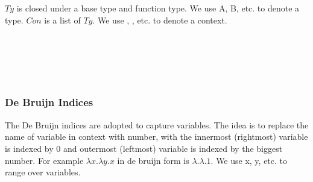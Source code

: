 $Ty$ is closed under a base type and function type. We use A, B, etc. to denote a type. $Con$ is a list of $Ty$. We use \Gamma, \Delta, etc. to denote a context.

\begin{code}[hide]%
\>[0]\AgdaSpace{}%
\AgdaSpace{}%
\<%
\\
\>[0]\AgdaSpace{}%
\AgdaSpace{}%
\AgdaSpace{}%
\AgdaSpace{}%
\AgdaSymbol{:}\AgdaSpace{}%
\<%
\\
%
\\[\AgdaEmptyExtraSkip]%
\>[0]\AgdaSpace{}%
\AgdaSpace{}%
\<%
\\
\>[0]\AgdaSpace{}%
\AgdaSpace{}%
\AgdaSpace{}%
\AgdaSpace{}%
\AgdaSymbol{:}\AgdaSpace{}%
\<%
\end{code}

\subsubsection*{De Bruijn Indices}

The De Bruijn indices are adopted to capture variables. The idea is to replace the name of variable in context with number, with the innermost (rightmost) variable is indexed by 0 and outermost (leftmost) variable is indexed by the biggest number. For example $\lambda x.\lambda y.x$ in de bruijn form is $\lambda.\lambda.1$. We use x, y, etc. to range over variables.

\begin{code}%
\>[0]\AgdaSpace{}%
\AgdaSpace{}%
\AgdaSymbol{:}\AgdaSpace{}%
\AgdaSpace{}%
\AgdaSpace{}%
\AgdaSpace{}%
\AgdaSpace{}%
\AgdaSpace{}%
\<%
\\
\>[0][@{}l@{\AgdaIndent{0}}]%
\>[2]\AgdaSpace{}%
\AgdaSymbol{:}\AgdaSpace{}%
\AgdaSpace{}%
\AgdaSymbol{(}\AgdaSpace{}%
\AgdaSpace{}%
\AgdaSymbol{)}\AgdaSpace{}%
\<%
\\
%
\>[2]\AgdaSpace{}%
\AgdaSymbol{:}\AgdaSpace{}%
\AgdaSpace{}%
\AgdaSpace{}%
\AgdaSpace{}%
\AgdaSpace{}%
\AgdaSpace{}%
\AgdaSymbol{(}\AgdaSpace{}%
\AgdaSpace{}%
\AgdaSymbol{)}\AgdaSpace{}%
\<%
\end{code}

